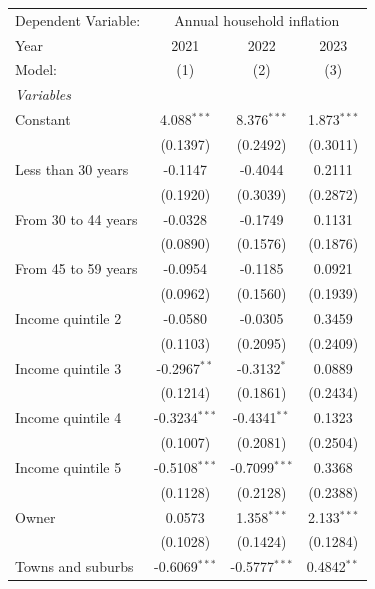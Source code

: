 
\begingroup
\centering
\begin{tabular}{lccc}
   \tabularnewline \midrule \midrule
   Dependent Variable: & \multicolumn{3}{c}{Annual household inflation}\\
   Year                & 2021            & 2022            & 2023 \\   
   Model:              & (1)             & (2)             & (3)\\  
   \midrule
   \emph{Variables}\\
   Constant            & 4.088$^{***}$   & 8.376$^{***}$   & 1.873$^{***}$\\   
                       & (0.1397)        & (0.2492)        & (0.3011)\\   
   Less than 30 years  & -0.1147         & -0.4044         & 0.2111\\   
                       & (0.1920)        & (0.3039)        & (0.2872)\\   
   From 30 to 44 years & -0.0328         & -0.1749         & 0.1131\\   
                       & (0.0890)        & (0.1576)        & (0.1876)\\   
   From 45 to 59 years & -0.0954         & -0.1185         & 0.0921\\   
                       & (0.0962)        & (0.1560)        & (0.1939)\\   
   Income quintile 2   & -0.0580         & -0.0305         & 0.3459\\   
                       & (0.1103)        & (0.2095)        & (0.2409)\\   
   Income quintile 3   & -0.2967$^{**}$  & -0.3132$^{*}$   & 0.0889\\   
                       & (0.1214)        & (0.1861)        & (0.2434)\\   
   Income quintile 4   & -0.3234$^{***}$ & -0.4341$^{**}$  & 0.1323\\   
                       & (0.1007)        & (0.2081)        & (0.2504)\\   
   Income quintile 5   & -0.5108$^{***}$ & -0.7099$^{***}$ & 0.3368\\   
                       & (0.1128)        & (0.2128)        & (0.2388)\\   
   Owner               & 0.0573          & 1.358$^{***}$   & 2.133$^{***}$\\   
                       & (0.1028)        & (0.1424)        & (0.1284)\\   
   Towns and suburbs   & -0.6069$^{***}$ & -0.5777$^{***}$ & 0.4842$^{**}$\\   

\end{tabular}
